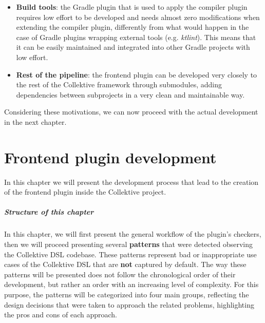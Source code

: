 \documentclass[12pt,a4paper,openright,twoside]{book}
\begin{document}
\begin{enumerate}
\begin{itemize}
    \item \textbf{Build tools}: the Gradle plugin that is used to apply the
    compiler plugin requires low effort to be developed and needs almost zero
    modifications when extending the compiler plugin, differently from what
    would happen in the case of Gradle plugins wrapping external tools (e.g.
    \emph{ktlint}). This means that it can be easily maintained and integrated
    into other Gradle projects with low effort.

    \item \textbf{Rest of the pipeline}: the frontend plugin can be developed 
    very closely to the rest of the Collektive framework through submodules,
    adding dependencies between subprojects in a very clean and maintainable
    way.
  \end{itemize}
\end{enumerate}

Considering these motivations, we can now proceed with the actual development in
the next chapter.

\chapter{Frontend plugin development}
\label{chap:contribution}

In this chapter we will present the development process that lead to the creation of 
the frontend plugin inside the Collektive project.

\paragraph{Structure of this chapter}

In this chapter, we will first present the general workflow of the plugin's
checkers, then we will proceed presenting several \textbf{patterns} that were
detected observing the Collektive \ac{DSL} codebase. These patterns represent
bad or inappropriate use cases of the Collektive \ac{DSL} that are \textbf{not}
captured by default. 
%
The way these patterns will be presented does not follow the chronological order 
of their development, but rather an order with an increasing level of complexity.
For this purpose, the patterns will be categorized into four main groups, 
reflecting the design decisions that were taken to approach the related problems,
highlighting the pros and cons of each approach. 
\end{document}

